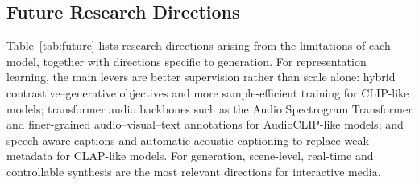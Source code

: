 \documentclass[pdflatex,sn-mathphys-num]{sn-jnl}%
\theoremstyle{thmstyleone}%
\theoremstyle{thmstyletwo}%
\theoremstyle{thmstylethree}%
\begin{document}
\subsection{Future Research Directions}

Table~\ref{tab:future} lists research directions arising from the limitations of each model, together with directions specific to generation. For representation learning, the main levers are better supervision rather than scale alone: hybrid contrastive--generative objectives and more sample-efficient training for CLIP-like models; transformer audio backbones such as the Audio Spectrogram Transformer \cite{gong2021ast} and finer-grained audio--visual--text annotations for AudioCLIP-like models; and speech-aware captions and automatic acoustic captioning to replace weak metadata for CLAP-like models. For generation, scene-level, real-time and controllable synthesis are the most relevant directions for interactive media.
\end{document}
